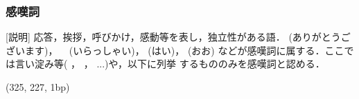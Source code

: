         

\subsubsection{感嘆詞}        
[説明] 応答，挨拶，呼びかけ，感動等を表し，独立性がある語．
(ありがとうございます)，
\ 
(いらっしゃい)，
(はい)，
(おお)
などが感嘆詞に属する．ここでは言い淀み等(
，
，
 ...)や，以下に列挙
するもののみを感嘆詞と認める．
\vspace{\baselineskip}


    \begin{epsf}
    \end{epsf}
    \begin{draft}
\atari(325, 227, 1bp)
    \end{draft}
\vspace{\baselineskip}

